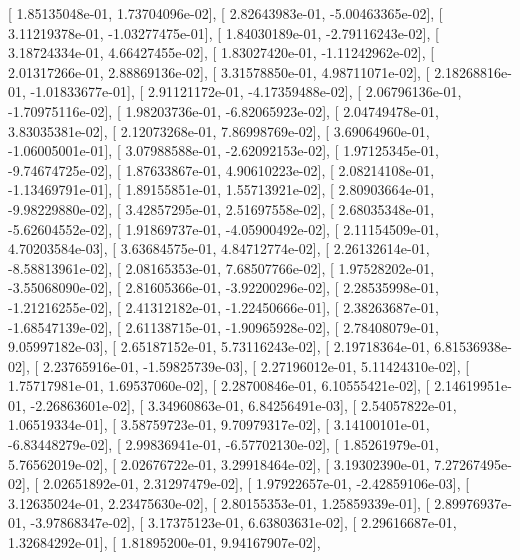 \documentclass{article}
\begin{document}
       [  1.85135048e-01,   1.73704096e-02],
       [  2.82643983e-01,  -5.00463365e-02],
       [  3.11219378e-01,  -1.03277475e-01],
       [  1.84030189e-01,  -2.79116243e-02],
       [  3.18724334e-01,   4.66427455e-02],
       [  1.83027420e-01,  -1.11242962e-02],
       [  2.01317266e-01,   2.88869136e-02],
       [  3.31578850e-01,   4.98711071e-02],
       [  2.18268816e-01,  -1.01833677e-01],
       [  2.91121172e-01,  -4.17359488e-02],
       [  2.06796136e-01,  -1.70975116e-02],
       [  1.98203736e-01,  -6.82065923e-02],
       [  2.04749478e-01,   3.83035381e-02],
       [  2.12073268e-01,   7.86998769e-02],
       [  3.69064960e-01,  -1.06005001e-01],
       [  3.07988588e-01,  -2.62092153e-02],
       [  1.97125345e-01,  -9.74674725e-02],
       [  1.87633867e-01,   4.90610223e-02],
       [  2.08214108e-01,  -1.13469791e-01],
       [  1.89155851e-01,   1.55713921e-02],
       [  2.80903664e-01,  -9.98229880e-02],
       [  3.42857295e-01,   2.51697558e-02],
       [  2.68035348e-01,  -5.62604552e-02],
       [  1.91869737e-01,  -4.05900492e-02],
       [  2.11154509e-01,   4.70203584e-03],
       [  3.63684575e-01,   4.84712774e-02],
       [  2.26132614e-01,  -8.58813961e-02],
       [  2.08165353e-01,   7.68507766e-02],
       [  1.97528202e-01,  -3.55068090e-02],
       [  2.81605366e-01,  -3.92200296e-02],
       [  2.28535998e-01,  -1.21216255e-02],
       [  2.41312182e-01,  -1.22450666e-01],
       [  2.38263687e-01,  -1.68547139e-02],
       [  2.61138715e-01,  -1.90965928e-02],
       [  2.78408079e-01,   9.05997182e-03],
       [  2.65187152e-01,   5.73116243e-02],
       [  2.19718364e-01,   6.81536938e-02],
       [  2.23765916e-01,  -1.59825739e-03],
       [  2.27196012e-01,   5.11424310e-02],
       [  1.75717981e-01,   1.69537060e-02],
       [  2.28700846e-01,   6.10555421e-02],
       [  2.14619951e-01,  -2.26863601e-02],
       [  3.34960863e-01,   6.84256491e-03],
       [  2.54057822e-01,   1.06519334e-01],
       [  3.58759723e-01,   9.70979317e-02],
       [  3.14100101e-01,  -6.83448279e-02],
       [  2.99836941e-01,  -6.57702130e-02],
       [  1.85261979e-01,   5.76562019e-02],
       [  2.02676722e-01,   3.29918464e-02],
       [  3.19302390e-01,   7.27267495e-02],
       [  2.02651892e-01,   2.31297479e-02],
       [  1.97922657e-01,  -2.42859106e-03],
       [  3.12635024e-01,   2.23475630e-02],
       [  2.80155353e-01,   1.25859339e-01],
       [  2.89976937e-01,  -3.97868347e-02],
       [  3.17375123e-01,   6.63803631e-02],
       [  2.29616687e-01,   1.32684292e-01],
       [  1.81895200e-01,   9.94167907e-02],
\end{document}
